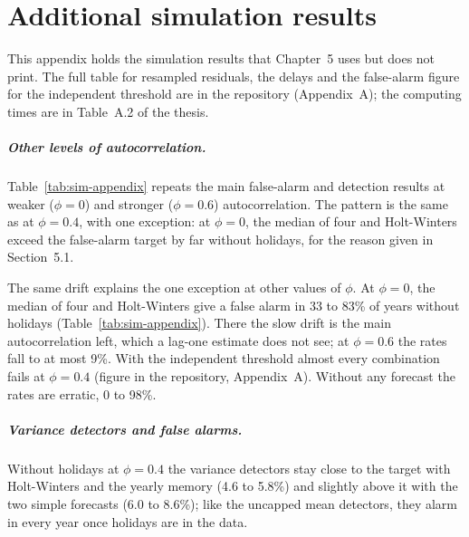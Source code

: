 \chapter{Additional simulation results}\label{app:sim}

This appendix holds the simulation results that Chapter~5 uses but does not print. The full table for resampled residuals, the delays and the false-alarm figure for the independent threshold are in the repository (Appendix~A); the computing times are in Table~A.2 of the thesis.

\paragraph{Other levels of autocorrelation.} Table~\ref{tab:sim-appendix} repeats the main false-alarm and detection results at weaker ($\phi=0$) and stronger ($\phi=0.6$) autocorrelation. The pattern is the same as at $\phi=0.4$, with one exception: at $\phi=0$, the median of four and Holt-Winters exceed the false-alarm target by far without holidays, for the reason given in Section~5.1.



The same drift explains the one exception at other values of $\phi$. At $\phi=0$, the median of four and Holt-Winters give a false alarm in 33 to 83\% of years without holidays (Table~\ref{tab:sim-appendix}). There the slow drift is the main autocorrelation left, which a lag-one estimate does not see; at $\phi=0.6$ the rates fall to at most 9\%. With the independent threshold almost every combination fails at $\phi=0.4$ (figure in the repository, Appendix~A). Without any forecast the rates are erratic, 0 to 98\%.

\paragraph{Variance detectors and false alarms.} Without holidays at $\phi=0.4$ the variance detectors stay close to the target with Holt-Winters and the yearly memory (4.6 to 5.8\%) and slightly above it with the two simple forecasts (6.0 to 8.6\%); like the uncapped mean detectors, they alarm in every year once holidays are in the data.

